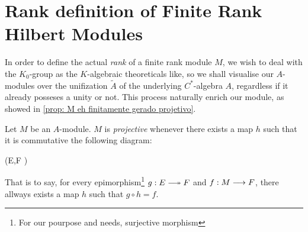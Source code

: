 \section{Rank definition of Finite Rank Hilbert Modules}
In order to define the actual \textit{rank} of a finite rank module $M$, we wish to deal with the $K_0$-group as the $K$-algebraic theoreticals like, so we shall visualise our $A$-modules over the unifization $\widetilde A$ of the underlying $C^*$-algebra $A$, regardless if it already posseses a unity or not. This process naturally enrich our module, as showed in \ref{prop: M eh finitamente gerado projetivo}.

\begin{definicao}
Let $M$ be an $A$-module. $M$ is \textit{projective} whenever there exists a map $h$ such that it is commutative the following diagram:
\begin{eqspaced*}{(E,F \in {})}
\end{eqspaced*}
That is to say, for every epimorphism\footnote{For our pourpose and needs, surjective morphism} $g: E \longtwoheadrightarrow F$ and $f:M \longrightarrow F$, there allways exists a map $h$ such that $g\circ h = f$.
\end{definicao}

